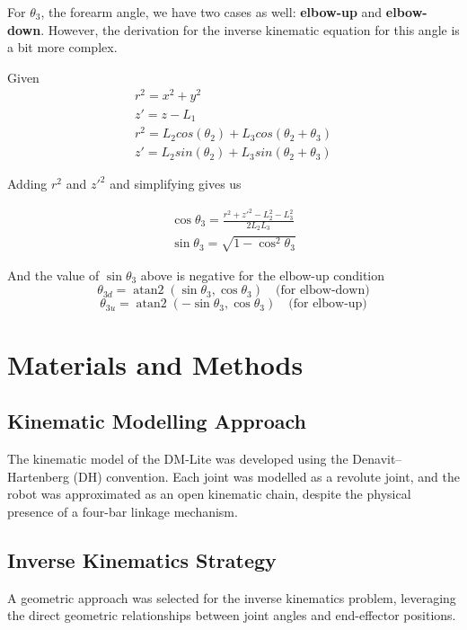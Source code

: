 \documentclass[12pt,a4paper]{article}
\begin{document}
For $\theta_3$, the forearm angle, we have two cases as well: \textbf{elbow-up} and \textbf{elbow-down}. However, the derivation for the inverse kinematic equation for this angle is a bit more complex.

Given
\begin{align}
    r^2 = x^2 + y^2 \\
    z' = z - L_1 \\
    r^2 = L_2 cos(\theta_2) + L_3 cos(\theta_2 + \theta_3) \\
    z' = L_2 sin(\theta_2) + L_3 sin(\theta_2 + \theta_3)
\end{align}

Adding $r^2$ and $z'^2$ and simplifying gives us

\begin{align}
    \cos \theta_3 = \frac{r^2 + z'^2 - L_2^2 - L_3^2}{2L_2L_3} \\
    \sin \theta_3 = \sqrt{1 - \cos^2 \theta_3}
\end{align}

And the value of $\sin \theta_3$ above is negative for the elbow-up condition
\begin{equation}
    \theta_{3d} = \operatorname{atan2}(\sin \theta_3, \cos \theta_3) \quad \text{(for elbow-down)}
\end{equation}
\begin{equation}
    \theta_{3u} = \operatorname{atan2}(-\sin \theta_3, \cos \theta_3) \quad \text{(for elbow-up)}
\end{equation}

\section{Materials and Methods}

\subsection{Kinematic Modelling Approach}

The kinematic model of the DM-Lite was developed using the Denavit--Hartenberg (DH) convention. Each joint was
modelled as a revolute joint, and the robot was approximated as an open
kinematic chain, despite the physical presence of a four-bar linkage mechanism.

\subsection{Inverse Kinematics Strategy}
A geometric approach was selected for the inverse kinematics problem, leveraging 
the direct geometric relationships between joint angles and end-effector positions. 
\end{document}
